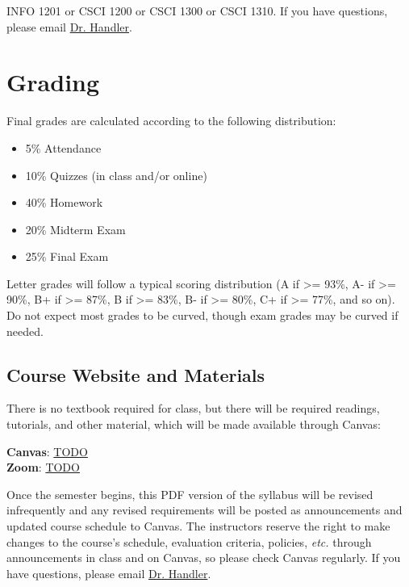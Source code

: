 \documentclass[10pt]{memoir}
\makeatletter
\def\myzoomurl{TODO}
\def\mycanvasurl{TODO}
\def\instructorAlastname{Handler}
\def\instructorAemail{abe.handler@colorado.edu}
\makeatother
\begin{document}
INFO 1201 or CSCI 1200 or CSCI 1300 or CSCI 1310. If you have questions, please email \href{mailto:\instructorAemail}{Dr. \instructorAlastname}.

\section{Grading}


Final grades are calculated according to the following distribution:
\begin{itemize}
\item 5\% Attendance
\item 10\% Quizzes (in class and/or online)
\item 40\% Homework
\item 20\% Midterm Exam
\item 25\% Final Exam
\end{itemize}

Letter grades will follow a typical scoring distribution (A if >= 93\%, A- if >= 90\%, B+ if >=
87\%, B if >= 83\%, B- if >= 80\%, C+ if >= 77\%, and so on). Do not expect most grades to be
curved, though exam grades may be curved if needed.


\subsection{Course Website and Materials}
There is no textbook required for class, but there will be required readings, tutorials, and other material, which will be made available through Canvas:
\vspace{-8pt}
    \begin{center}
    \Large{\textbf{Canvas}: \href{\mycanvasurl}{\mycanvasurl}}\\
    \Large{\textbf{Zoom}: \href{\myzoomurl}{\myzoomurl}}
    \end{center}
\vspace{-8pt}
Once the semester begins, this PDF version of the syllabus will be revised infrequently and any revised requirements will be posted as announcements and updated course schedule to Canvas. The instructors reserve the right to make changes to the course's schedule, evaluation criteria, policies, \textit{etc.} through announcements in class and on Canvas, so please check Canvas regularly. If you have questions, please email \href{mailto:\instructorAemail}{Dr. \instructorAlastname}.
\end{document}
